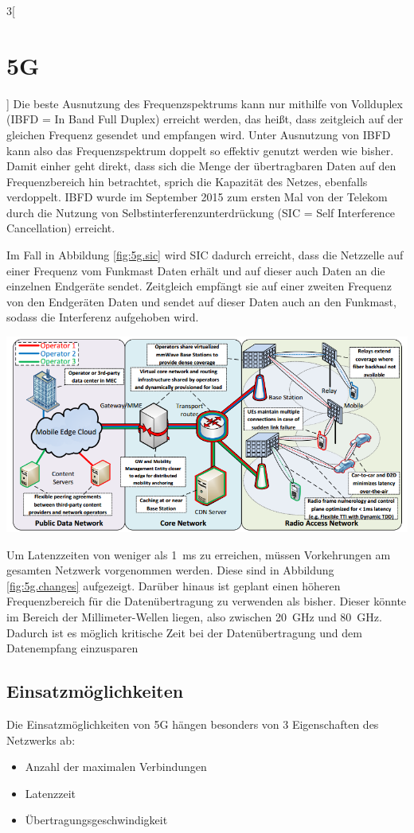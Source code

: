 \begin{multicols}{3}[\section{5G}]
Die beste Ausnutzung des Frequenzspektrums kann nur mithilfe von Vollduplex (IBFD = In Band Full Duplex) erreicht werden, das heißt, dass zeitgleich auf der gleichen Frequenz gesendet und empfangen wird.
Unter Ausnutzung von IBFD kann also das Frequenzspektrum doppelt so effektiv genutzt werden wie bisher. Damit einher geht direkt, dass sich die Menge der übertragbaren Daten auf den Frequenzbereich hin betrachtet, sprich die Kapazität des Netzes, ebenfalls verdoppelt.
IBFD wurde im September 2015 zum ersten Mal von der Telekom durch die Nutzung von Selbstinterferenzunterdrückung (SIC = Self Interference Cancellation) erreicht.

Im Fall in Abbildung \ref{fig:5g.sic} wird SIC dadurch erreicht, dass die Netzzelle auf einer Frequenz vom Funkmast Daten erhält und auf dieser auch Daten an die einzelnen Endgeräte sendet. Zeitgleich empfängt sie auf einer zweiten Frequenz von den Endgeräten Daten und sendet auf dieser Daten auch an den Funkmast, sodass die Interferenz aufgehoben wird.

\begin{Figure}
\includegraphics[width=\linewidth]{Kapitel/5G/Grafiken/5g-changes}
\label{fig:5g.changes}
\end{Figure}


Um Latenzzeiten von weniger als \SI{1}{\milli\second} zu erreichen, müssen Vorkehrungen am gesamten  Netzwerk vorgenommen werden. Diese sind in Abbildung \ref{fig:5g.changes} aufgezeigt.
Darüber hinaus ist geplant einen höheren Frequenzbereich für die Datenübertragung zu verwenden als bisher. Dieser könnte im Bereich der Millimeter-Wellen liegen, also zwischen \SI{20}{\giga\hertz} und \SI{80}{\giga\hertz}.
Dadurch ist es möglich kritische Zeit bei der Datenübertragung und dem Datenempfang einzusparen
\subsection*{Einsatzmöglichkeiten}
Die Einsatzmöglichkeiten von 5G hängen besonders von 3 Eigenschaften des Netzwerks ab:
\begin{itemize}
\item Anzahl der maximalen Verbindungen
\item Latenzzeit
\item Übertragungsgeschwindigkeit
\end{itemize}


\end{multicols}
